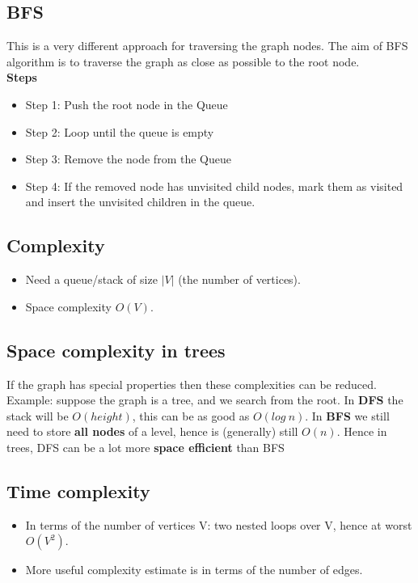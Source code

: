 \documentclass{article}
\begin{document}
\subsection{BFS}
\begin{flushleft}
This is a very different approach for traversing the graph nodes. The aim of BFS algorithm is to traverse the graph as close as possible to the root node.\\
\textbf{Steps}
	\begin{itemize}
		\item Step 1: Push the root node in the Queue
		\item Step 2: Loop until the queue is empty
		\item Step 3: Remove the node from the Queue
		\item Step 4: If the removed node has unvisited child nodes, mark them as visited and insert the unvisited children in the queue.
	\end{itemize}
\end{flushleft}

\subsection{Complexity}
\begin{itemize}
	\item Need a queue/stack of size $|V|$ (the number of vertices).
	\item Space complexity $O(V)$.
\end{itemize}

\subsection{Space complexity in trees}
\begin{flushleft}
If the graph has special properties then these complexities can be reduced. Example: suppose the graph is a tree, and we search from the root. In \textbf{DFS} the stack will be $O(height)$, this can be as good as $O(log \: n)$. In \textbf{BFS} we still need to store \textbf{all nodes} of a level, hence is (generally) still $O(n)$. Hence in trees, DFS can be a lot more \textbf{space efficient} than BFS
\end{flushleft}


\subsection{Time complexity}
\begin{itemize}
	\item In terms of the number of vertices V: two nested loops over V, hence at worst $O(V^2)$.
	\item More useful complexity estimate is in terms of the number of edges.
\end{itemize}
\end{document}
